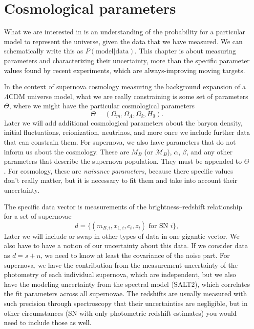 \chapter{Cosmological parameters}\label{ch:likelihoods_cosmology}\label{ch:cosmological_parameters} 
 
What we are interested in is an understanding of the probability for a particular model to represent the universe, given the data that we have measured.  We can schematically write this as $P(\mbox{model}|\mbox{data})$.  This chapter is about measuring parameters and characterizing their uncertainty, more than the specific parameter values found by recent experiments, which are always-improving moving targets.

In the context of supernova cosmology measuring the background expansion of a $\Lambda$CDM universe model, what we are really constraining is some set of parameters $\Theta$, where we might have the particular cosmological parameters
\begin{equation}
  \Theta = (\Omega_m,\Omega_\Lambda,\Omega_k, H_0).
\end{equation}
Later we will add additional cosmological parameters about the baryon density, initial fluctuations, reionization, neutrinos, and more once  we include further data that can constrain them.  For supernova, we also have parameters that do not inform us about the cosmology.  These are $M_B$ (or $\mathcal{M}_B$), $\alpha$, $\beta$, and any other parameters that describe the supernova population.  They must be appended to $\Theta$.  For cosmology, these are \textit{nuisance parameters}, because there specific values don't really matter, but it is necessary to fit them and take into account their uncertainty. 

The specific data vector is measurements of the brightness--redshift relationship for a set of supernovae
\begin{equation}
  d = \{  (m_{B,i},x_{1,i},c_i,z_i) \mbox{ for SN }i \},
\end{equation}
Later we will include or swap in other types of data in one gigantic vector.  
We also have to have a notion of our uncertainty about this data.  If we consider data as $d = s + n$, we need to know at least the covariance of the noise part.  For supernova, 
we have the contribution from the measurement uncertainty of the photometry of each individual supernova, which are independent, but we also have the modeling uncertainty from the spectral model (SALT2), which correlates the fit parameters across all supernovae.  The redshifts are usually measured with such precision through spectroscopy that their uncertainties are negligible, but in other circumstances (SN with only photometric redshift estimates) you would need to include those as well.


